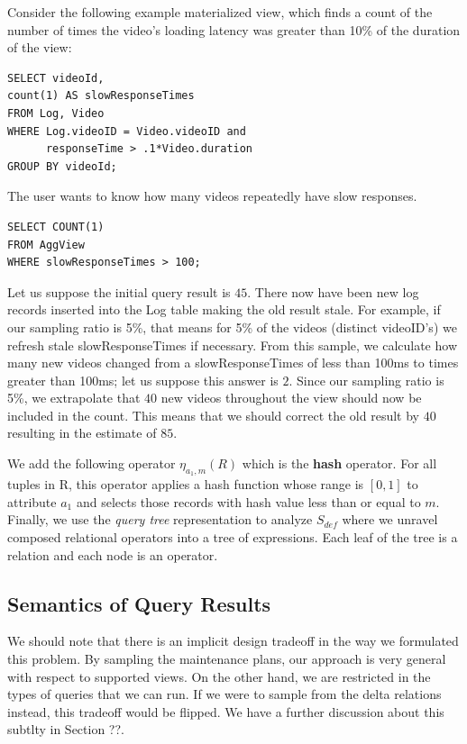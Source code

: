 Consider the following example materialized view, which finds a count of the number of times the video's loading latency was greater than 10\% of the duration of the view:

\vspace{0.5em}

\begin{lstlisting} 
SELECT videoId, 
count(1) AS slowResponseTimes 
FROM Log, Video
WHERE Log.videoID = Video.videoID and
	  responseTime > .1*Video.duration
GROUP BY videoId;
\end{lstlisting}

The user wants to know how many videos repeatedly have slow responses.
\begin{lstlisting} 
SELECT COUNT(1)
FROM AggView
WHERE slowResponseTimes > 100;
\end{lstlisting}
Let us suppose the initial query result is $45$.
There now have been new log records inserted into the Log table making the old result stale.
For example, if our sampling ratio is 5\%, that means for 5\% of the videos (distinct videoID's) we refresh stale slowResponseTimes if necessary.
From this sample, we calculate how many new videos changed from a slowResponseTimes of less than 100ms to times greater than 100ms; let us suppose this answer is $2$.
Since our sampling ratio is 5\%, we extrapolate that $40$ new videos throughout the view should now be included in the count.
This means that we should correct the old result by $40$ resulting in the estimate of $85$.

\iffalse
We add the following operator $\eta_{a_1, m}(R)$ which is the \textbf{hash} operator.
For all tuples in R, this operator applies a hash function whose range is $[0,1]$ to attribute $a_1$ and selects those records with hash value less than or equal to $m$.
Finally, we use the \emph{query tree} representation to analyze $S_{def}$ where we unravel composed relational operators into a tree of expressions.
Each leaf of the tree is a relation and each node is an operator.



\subsection{Semantics of Query Results}
We should note that there is an implicit design tradeoff in the way we formulated this problem.
By sampling the maintenance plans, our approach is very general with respect to supported views.
On the other hand, we are restricted in the types of queries that we can run.
If we were to sample from the delta relations instead, this tradeoff would be flipped. 
We have a further discussion about this subtlty in Section ??.

